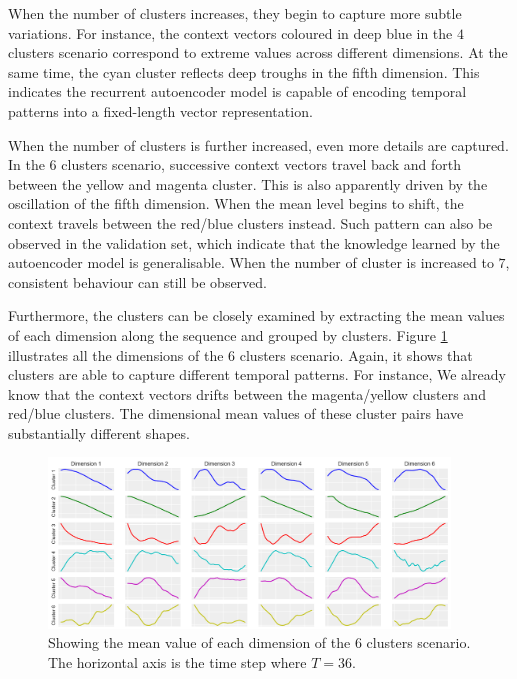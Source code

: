 \documentclass[11pt]{article} %
\theoremstyle{plain}
\theoremstyle{definition}
\begin{document}
When the number of clusters increases, they begin to capture more subtle variations. For instance, the context vectors coloured in deep blue in the \(4\) clusters scenario correspond to extreme values across different dimensions. At the same time, the cyan cluster reflects deep troughs in the fifth dimension. This indicates the recurrent autoencoder model is capable of encoding temporal patterns into a fixed-length vector representation.

When the number of clusters is further increased, even more details are captured. In the \(6\) clusters scenario, successive context vectors travel back and forth between the yellow and magenta cluster. This is also apparently driven by the oscillation of the fifth dimension. When the mean level begins to shift, the context travels between the red/blue clusters instead. Such pattern can also be observed in the validation set, which indicate that the knowledge learned by the autoencoder model is generalisable. When the number of cluster is increased to \(7\), consistent behaviour can still be observed.

Furthermore, the clusters can be closely examined by extracting the mean values of each dimension along the sequence and grouped by clusters. Figure \ref{fig:cluster_boxplot} illustrates all the dimensions of the \(6\) clusters scenario. Again, it shows that clusters are able to capture different temporal patterns. For instance, We already know that the context vectors drifts between the magenta/yellow clusters and red/blue clusters. The dimensional mean values of these cluster pairs have substantially different shapes. 

\begin{figure}[H]
	\centering
	\includegraphics[width=0.95\textwidth]{cluster_boxplot.PNG}
	\caption{Showing the mean value of each dimension of the \(6\) clusters scenario. The horizontal axis is the time step where \(T=36\).}
	\label{fig:cluster_boxplot}
\end{figure}
\end{document}
